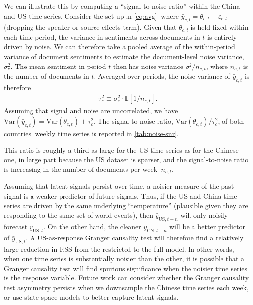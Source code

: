 \documentclass[12pt,letterpaper]{article}
\begin{document}
We can illustrate this by computing a ``signal-to-noise ratio'' within the China and US time series. Consider the set-up in \cref{eq:avg}, where $\bar y_{c,t} = \theta_{c,t} + \bar\varepsilon_{c,t}$ (dropping the speaker or source effects term). Given that $\theta_{c,t}$ is held fixed within each time period, the variance in sentiments across documents in $t$ is entirely driven by noise. We can therefore take a pooled average of the within-period variance of document sentiments to estimate the document-level noise variance, $\sigma_c^2$. The mean sentiment in period $t$ then has noise variance $\sigma_c^2/n_{c,t}$, where $n_{c,t}$ is the number of documents in $t$. Averaged over periods, the noise variance of $\bar y_{c,t}$ is therefore
\begin{align}
  \tau_c^2 \equiv \sigma_c^2 \cdot \mathbb E\!\left[1/n_{c,t}\right].
\end{align}
Assuming that signal and noise are uncorrelated, we have $\mathrm{Var}(\bar y_{c,t}) = \mathrm{Var}(\theta_{c,t}) + \tau_c^2$. The signal-to-noise ratio, $\mathrm{Var}(\theta_{c,t}) / \tau_c^2$, of both countries' weekly time series is reported in \cref{tab:noise-snr}.



This ratio is roughly a third as large for the US time series as for the Chinese one, in large part because the US dataset is sparser, and the signal-to-noise ratio is increasing in the number of documents per week, $n_{c,t}$. 

Assuming that latent signals persist over time, a noisier measure of the past signal is a weaker predictor of future signals. Thus, if the US and China time series are driven by the same underlying ``temperature'' (plausible given they are responding to the same set of world events), then $\bar{y}_{\mathrm{US},t-n}$ will only noisily forecast $\bar{y}_{\mathrm{US},t}$. On the other hand, the cleaner $\bar{y}_{\mathrm{CN},t-n}$ will be a better predictor of $\bar{y}_{\mathrm{US},t}$. A US-as-response Granger causality test will therefore find a relatively large reduction in RSS from the restricted to the full model. In other words, when one time series is substantially noisier than the other, it is possible that a Granger causality test will find spurious significance when the noisier time series is the response variable. Future work can consider whether the Granger causality test asymmetry persists when we downsample the Chinese time series each week, or use state-space models to better capture latent signals.
\end{document}
